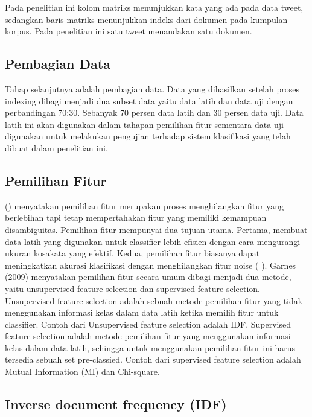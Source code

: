 Pada penelitian ini kolom matriks menunjukkan kata yang ada pada data tweet, sedangkan baris matriks menunjukkan indeks dari dokumen pada kumpulan korpus. Pada penelitian ini satu tweet menandakan satu dokumen.

\subsection*{Pembagian Data}

Tahap selanjutnya adalah pembagian data. Data yang dihasilkan setelah proses indexing dibagi  menjadi  dua subset data yaitu data latih dan data uji dengan perbandingan 70:30. Sebanyak 70 persen data latih dan 30 persen data uji. Data latih ini akan digunakan dalam tahapan pemilihan fitur sementara data uji digunakan untuk melakukan pengujian terhadap sistem klasifikasi yang telah dibuat dalam penelitian ini.

\subsection*{Pemilihan Fitur}

\citeauthor{NARAYANAN2013} (\cite*{NARAYANAN2013}) menyatakan pemilihan fitur  merupakan proses menghilangkan fitur yang berlebihan tapi tetap mempertahakan fitur yang memiliki kemampuan disambiguitas. Pemilihan  fitur mempunyai dua tujuan utama. Pertama, membuat data latih yang digunakan untuk classifier lebih efisien dengan cara mengurangi ukuran kosakata yang efektif. Kedua, pemilihan fitur biasanya dapat meningkatkan akurasi klasifikasi dengan menghilangkan fitur noise (\citeauthor{NARAYANAN2013} \cite*{NARAYANAN2013}). 
Garnes (2009) menyatakan pemilihan fitur secara umum dibagi menjadi dua metode, yaitu unsupervised feature selection dan supervised feature selection. Unsupervised feature selection adalah sebuah metode pemilihan fitur yang tidak menggunakan informasi kelas dalam data latih ketika memilih fitur untuk classifier. Contoh dari Unsupervised feature selection adalah IDF. Supervised feature selection adalah metode pemilihan  fitur yang menggunakan informasi kelas dalam data latih, sehingga untuk menggunakan pemilihan fitur ini harus tersedia sebuah set pre-classied. Contoh dari supervised feature selection adalah Mutual Information (MI) dan Chi-square.


\subsection*{Inverse document frequency (IDF)}

